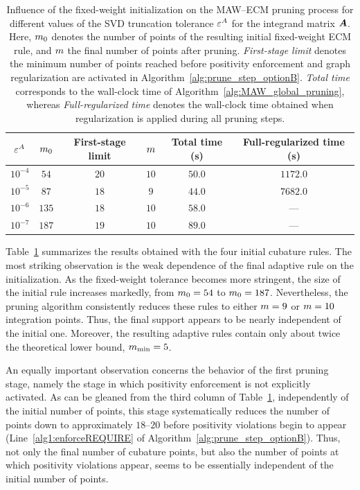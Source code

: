 \documentclass[preprint,10pt]{elsarticle}  %
\begin{document}
\begin{table}[ht!]
\centering
\caption{Influence of the fixed-weight initialization on the MAW--ECM pruning process for different values of the   SVD truncation tolerance $\varepsilon^A$ for the integrand matrix $\bm{A}$.  Here, $m_0$ denotes the number of points of the resulting initial fixed-weight ECM rule, and $m$ the final number of points after pruning. \emph{First-stage limit} denotes the minimum number of points reached before positivity enforcement and graph regularization are activated in Algorithm~\ref{alg:prune_step_optionB}. \emph{Total time} corresponds to the wall-clock time of Algorithm~\ref{alg:MAW_global_pruning}, whereas \emph{Full-regularized time} denotes the wall-clock time obtained when regularization is applied during all pruning steps.    }
\label{tab:maw_pruning_summary}
\begin{tabular}{cccccc}
\hline
$\varepsilon^A$ & $m_0$ & First-stage limit &   $m$ & Total time  (s) & Full-regularized time (s) \\
\hline
$10^{-4}$ & $54$  & $20$ & $10$ & $50.0$ & $  1172.0$ \\
$10^{-5}$ & $87$  & $18$ & $9$  & $44.0$ & $  7682.0$  \\
$10^{-6}$ & $135$ & $18$ & $10$ & $58.0$ & --- \\
$10^{-7}$ & $187$ & $19$ & $10$ & $89.0$ & --- \\
\hline
\end{tabular}
\end{table}


 Table~\ref{tab:maw_pruning_summary} summarizes the results obtained
with the four initial cubature rules. The most striking observation is
the weak dependence of the final adaptive rule on the initialization.
As the fixed-weight tolerance becomes more stringent, the size of the
initial rule increases markedly, from \(m_0=54\) to
\(m_0=187\). Nevertheless, the pruning algorithm consistently
reduces these rules to either \(m=9\) or \(m=10\)
integration points. Thus, the final support appears to be nearly
independent of the initial one. Moreover, the resulting adaptive rules
contain only about twice the theoretical lower bound,
\(m_{\textrm{min}}=5\).

%
 An equally important observation concerns the behavior of the first pruning stage, namely the stage in which positivity enforcement is not explicitly activated.  As can be gleaned from the third column of Table~\ref{tab:maw_pruning_summary}, independently of the initial number of points, this stage systematically reduces the number of points  down to approximately $18$--$20$   before positivity violations begin to appear (Line~\ref{alg1:enforceREQUIRE} of Algorithm~\ref{alg:prune_step_optionB}). Thus, not only the final number of cubature points, but also the number of points at which positivity violations appear, seems to be essentially independent of the initial number of points.
\end{document}
